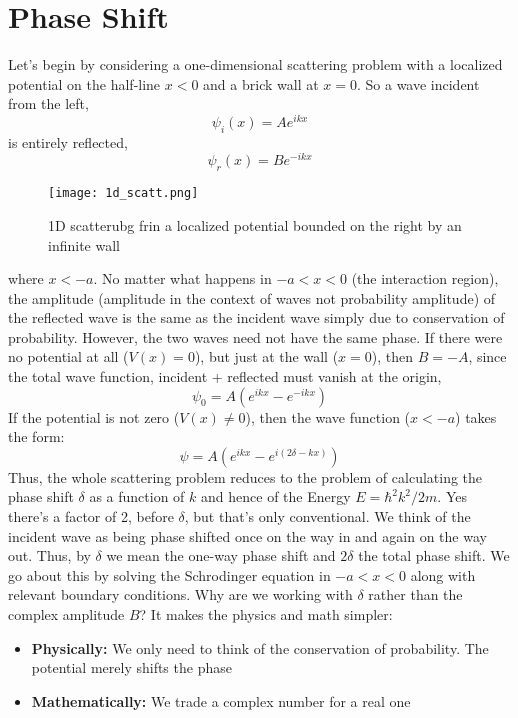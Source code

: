\section{Phase Shift}
Let's begin by considering a one-dimensional scattering problem with a localized potential on the half-line $x < 0$ and a brick wall at $x = 0$. So a wave incident from the left,
\begin{equation}
\psi_{i}(x) = A e^{ikx}
\end{equation}
is entirely reflected,
\begin{equation}
\psi_{r}(x) = B e^{-ikx}
\end{equation}
\begin{figure}[h]
	\centering
	\texttt{[image: 1d\_scatt.png]}
	\caption{1D scatterubg frin a localized potential bounded on the right by an infinite wall}
\end{figure}
where $x < -a$. No matter what happens in $-a < x < 0$ (the interaction region), the amplitude (amplitude in the context of waves not probability amplitude) of the reflected wave is the same as the incident wave simply due to conservation of probability. However, the two waves need not have the same phase. If there were no potential at all ($V(x) = 0$), but just at the wall ($x = 0$), then $B = -A$, since the total wave function, incident + reflected must vanish at the origin,
\begin{equation}
\psi_{0} = A (e^{ikx} - e^{-ikx})
\end{equation}
If the potential is not zero ($V(x) \neq 0$), then the wave function ($x < -a$) takes the form:
\begin{equation}
\psi = A \left(e^{ikx} - e^{i(2 \delta - kx)} \right)
\end{equation}
Thus, the whole scattering problem reduces to the problem of calculating the phase shift $\delta$ as a function of $k$ and hence of the Energy $E = \hbar^{2}k^{2}/2m$. Yes there's a factor of 2, before $\delta$, but that's only conventional. We think of the incident wave as being phase shifted once on the way in and again on the way out. Thus, by $\delta$ we mean the one-way phase shift and $2\delta$ the total phase shift. We go about this by solving the Schrodinger equation in $-a < x < 0$ along with relevant boundary conditions. Why are we working with $\delta$ rather than the complex amplitude $B$? It makes the physics and math simpler:
\begin{itemize}
\item \textbf{Physically:} We only need to think of the conservation of probability. The potential merely shifts the phase
\item \textbf{Mathematically:} We trade a complex number for a real one
\end{itemize}
